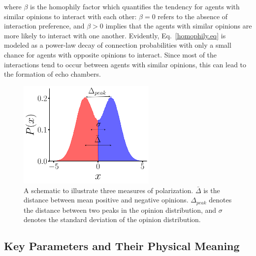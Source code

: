 where $\beta$ is the homophily factor which quantifies the tendency for agents with similar opinions to interact with each other: $\beta = 0$ refers to the absence of interaction preference, and $\beta > 0$ implies that the agents with similar opinions are more likely to interact with one another. Evidently, Eq.~\eqref{homophily.eq} is 
modeled as a power-law decay of connection probabilities with only a small chance for agents with opposite opinions to interact. Since most of the interactions tend to occur between agents with similar opinions, this can lead to the formation of echo chambers.

\begin{figure}[H]
    \centering
    \includegraphics[width=0.6\textwidth]{chapters/chapter2/polarization_definition.pdf}
    \caption{A schematic to illustrate three measures of polarization. \textbf{$\bar \Delta$} is the distance between mean positive and negative opinions.
    \textbf{$\Delta_{peak}$} denotes the distance between two peaks in the opinion distribution, and \textbf{$\sigma$} denotes the standard deviation of the opinion distribution.}
    \label{fig:pol_def}
\end{figure}

\subsection{Key Parameters and Their Physical Meaning}

